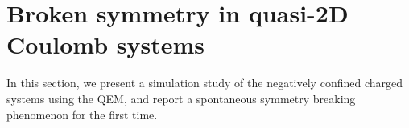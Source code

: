 \section{Broken symmetry in quasi-2D Coulomb systems}\label{sec::ssb}

In this section, we present a simulation study of the negatively confined charged systems using the QEM, and report a spontaneous symmetry breaking phenomenon for the first time.



